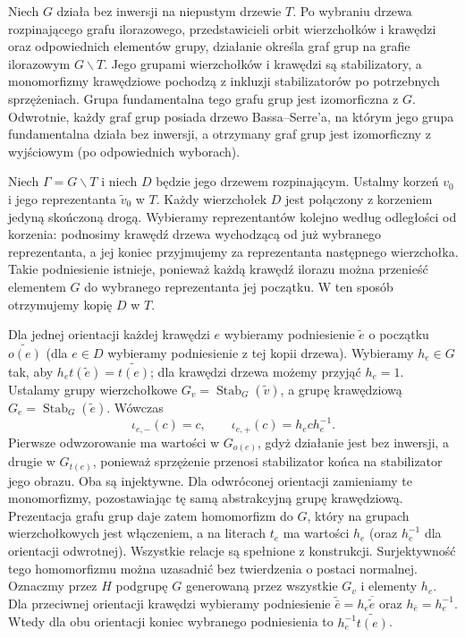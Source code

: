 \begin{twierdzenie}
Niech $G$ działa bez inwersji na niepustym drzewie $T$.
Po wybraniu drzewa rozpinającego grafu ilorazowego,
przedstawicieli orbit wierzchołków i krawędzi
oraz odpowiednich elementów grupy,
działanie określa graf grup na grafie ilorazowym
$G\backslash T$. Jego grupami wierzchołków i krawędzi
są stabilizatory, a monomorfizmy krawędziowe pochodzą
z inkluzji stabilizatorów po potrzebnych sprzężeniach. Grupa fundamentalna tego
grafu grup jest izomorficzna z $G$. Odwrotnie, każdy graf
grup posiada drzewo Bassa--Serre'a, na którym jego grupa
fundamentalna działa bez inwersji, a otrzymany graf grup
jest izomorficzny z wyjściowym (po odpowiednich wyborach).
\end{twierdzenie}

\begin{uwaga}
Niech $\Gamma=G\backslash T$ i niech $D$ będzie
jego drzewem rozpinającym. Ustalmy korzeń $v_0$
i jego reprezentanta $\widetilde v_0$ w $T$.
Każdy wierzchołek $D$ jest połączony z korzeniem
jedyną skończoną drogą. Wybieramy reprezentantów
kolejno według odległości od korzenia: podnosimy
krawędź drzewa wychodzącą od już wybranego
reprezentanta, a jej koniec przyjmujemy za
reprezentanta następnego wierzchołka.
Takie podniesienie istnieje, ponieważ każdą
krawędź ilorazu można przenieść elementem $G$
do wybranego reprezentanta jej początku.
W ten sposób otrzymujemy kopię $D$ w $T$.

Dla jednej orientacji każdej krawędzi $e$
wybieramy podniesienie $\widetilde e$ o początku
$\widetilde{o(e)}$ (dla $e\in D$ wybieramy
podniesienie z tej kopii drzewa).
Wybieramy $h_e\in G$ tak, aby
$h_e t(\widetilde e)=\widetilde{t(e)}$;
dla krawędzi drzewa możemy przyjąć $h_e=1$.
Ustalamy grupy wierzchołkowe
$G_v=\operatorname{Stab}_G(\widetilde v)$,
a grupę krawędziową
$G_e=\operatorname{Stab}_G(\widetilde e)$.
Wówczas
\[
 \iota_{e,-}(c)=c,\qquad
 \iota_{e,+}(c)=h_e c h_e^{-1}.
\]
Pierwsze odwzorowanie ma wartości w $G_{o(e)}$,
gdyż działanie jest bez inwersji, a drugie w
$G_{t(e)}$, ponieważ sprzężenie przenosi
stabilizator końca na stabilizator jego obrazu.
Oba są injektywne. Dla odwróconej orientacji
zamieniamy te monomorfizmy, pozostawiając
tę samą abstrakcyjną grupę krawędziową.
Prezentacja grafu grup daje zatem homomorfizm
do $G$, który na grupach wierzchołkowych
jest włączeniem, a na literach $t_e$ ma wartości
$h_e$ (oraz $h_e^{-1}$ dla orientacji odwrotnej).
Wszystkie relacje są spełnione z konstrukcji.
Surjektywność tego homomorfizmu można uzasadnić
bez twierdzenia o postaci normalnej. Oznaczmy
przez $H$ podgrupę $G$ generowaną przez
wszystkie $G_v$ i elementy $h_e$.
Dla przeciwnej orientacji krawędzi wybieramy
podniesienie $\widetilde{\bar e}=h_e\overline{\widetilde e}$
oraz $h_{\bar e}=h_e^{-1}$. Wtedy dla obu
orientacji koniec wybranego podniesienia to
$h_e^{-1}\widetilde{t(e)}$.


\end{uwaga}
